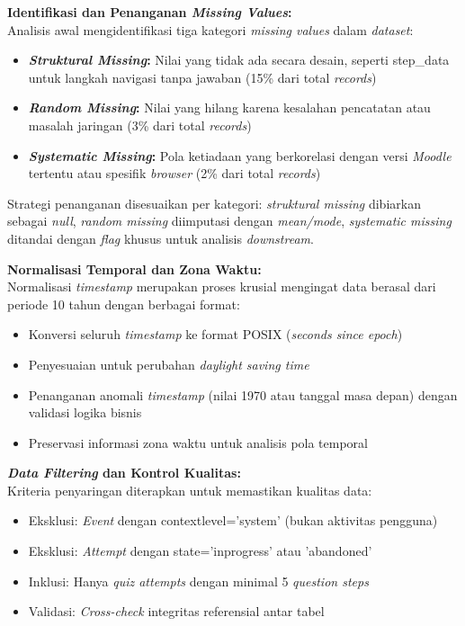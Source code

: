 \textbf{Identifikasi dan Penanganan \textit{Missing Values}:} \\
Analisis awal mengidentifikasi tiga kategori \textit{missing values} dalam \textit{dataset}:
\begin{itemize}
    \item \textbf{\textit{Struktural Missing}:} Nilai yang tidak ada secara desain, seperti step\_data untuk langkah navigasi tanpa jawaban (15\% dari total \textit{records})
    \item \textbf{\textit{Random Missing}:} Nilai yang hilang karena kesalahan pencatatan atau masalah jaringan (3\% dari total \textit{records})
    \item \textbf{\textit{Systematic Missing}:} Pola ketiadaan yang berkorelasi dengan versi \textit{Moodle} tertentu atau spesifik \textit{browser} (2\% dari total \textit{records})
\end{itemize}

Strategi penanganan disesuaikan per kategori: \textit{struktural missing} dibiarkan sebagai \textit{null}, \textit{random missing} diimputasi dengan \textit{mean/mode}, \textit{systematic missing} ditandai dengan \textit{flag} khusus untuk analisis \textit{downstream}.

\textbf{Normalisasi Temporal dan Zona Waktu:} \\
Normalisasi \textit{timestamp} merupakan proses krusial mengingat data berasal dari periode 10 tahun dengan berbagai format:
\begin{itemize}
    \item Konversi seluruh \textit{timestamp} ke format POSIX (\textit{seconds since epoch})
    \item Penyesuaian untuk perubahan \textit{daylight saving time}
    \item Penanganan anomali \textit{timestamp} (nilai 1970 atau tanggal masa depan) dengan validasi logika bisnis
    \item Preservasi informasi zona waktu untuk analisis pola temporal
\end{itemize}

\textbf{\textit{Data Filtering} dan Kontrol Kualitas:} \\
Kriteria penyaringan diterapkan untuk memastikan kualitas data:
\begin{itemize}
    \item Eksklusi: \textit{Event} dengan contextlevel='system' (bukan aktivitas pengguna)
    \item Eksklusi: \textit{Attempt} dengan state='inprogress' atau 'abandoned'
    \item Inklusi: Hanya \textit{quiz attempts} dengan minimal 5 \textit{question steps}
    \item Validasi: \textit{Cross-check} integritas referensial antar tabel
\end{itemize}

